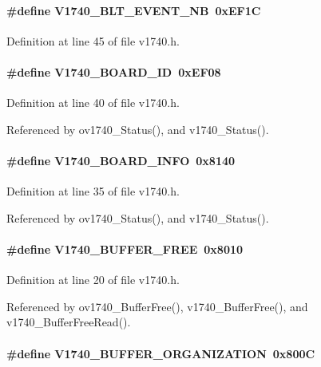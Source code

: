 \paragraph[{V1740\_\-BLT\_\-EVENT\_\-NB}]{\setlength{\rightskip}{0pt plus 5cm}\#define V1740\_\-BLT\_\-EVENT\_\-NB~0xEF1C}\hfill\label{v1740_8h_a9b060c95417f2c21a49f00651b50f0c0}


Definition at line 45 of file v1740.h.
\paragraph[{V1740\_\-BOARD\_\-ID}]{\setlength{\rightskip}{0pt plus 5cm}\#define V1740\_\-BOARD\_\-ID~0xEF08}\hfill\label{v1740_8h_a72f7211dbcbdbc237b91f468687b1bf1}


Definition at line 40 of file v1740.h.

Referenced by ov1740\_\-Status(), and v1740\_\-Status().
\paragraph[{V1740\_\-BOARD\_\-INFO}]{\setlength{\rightskip}{0pt plus 5cm}\#define V1740\_\-BOARD\_\-INFO~0x8140}\hfill\label{v1740_8h_a631074e43839e91ec9c5bd5d6b59c809}


Definition at line 35 of file v1740.h.

Referenced by ov1740\_\-Status(), and v1740\_\-Status().
\paragraph[{V1740\_\-BUFFER\_\-FREE}]{\setlength{\rightskip}{0pt plus 5cm}\#define V1740\_\-BUFFER\_\-FREE~0x8010}\hfill\label{v1740_8h_acaf58f3153522953ca402637046f3ee4}


Definition at line 20 of file v1740.h.

Referenced by ov1740\_\-BufferFree(), v1740\_\-BufferFree(), and v1740\_\-BufferFreeRead().
\paragraph[{V1740\_\-BUFFER\_\-ORGANIZATION}]{\setlength{\rightskip}{0pt plus 5cm}\#define V1740\_\-BUFFER\_\-ORGANIZATION~0x800C}\hfill\label{v1740_8h_a97bf1a67e700f82c9430d92e4b5ba140}



